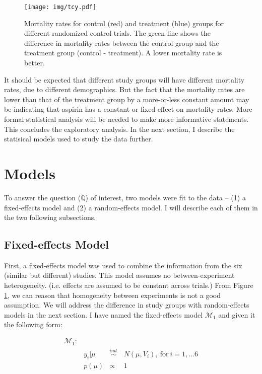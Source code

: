 \documentclass{../../tex_template/asaproc}
\newcommand{\M}{\mathcal{M}}
\newcommand{\Q}{\mathbb{Q}}
\newcommand{\simi}{\overset{ind.}{\sim}}
\begin{document}
\begin{figure}[H]
  \texttt{[image: img/tcy.pdf]}
  \caption{\small Mortality rates for control (red) and treatment (blue) groups
  for different randomized control trials. The green line shows the difference
  in mortality rates between the control group and the treatment group (control -
  treatment). A lower mortality rate is better.}
  \label{fig:tcy}
\end{figure}

It should be expected that different study groups will have different mortality
rates, due to different demographics. But the fact that the mortality rates are
lower than that of the treatment group by a more-or-less constant amount may be
indicating that aspirin has a constant or fixed effect on mortality rates.
More formal statistical analysis will be needed to make more informative
statements.\\

This concludes the exploratory analysis. In the next section, I describe the
statisical models used to study the data further.\\

\section{Models} 
To answer the question ($\Q$) of interest, two models were fit to the data --
(1) a fixed-effects model and (2) a random-effects model. I will describe each
of them in the two following subsections.\\

\subsection{Fixed-effects Model}
First, a fixed-effects model was used to combine the information from the six
(similar but different) studies. This model assumes no between-experiment
heterogeneity. (i.e. effects are assumed to be constant across trials.) From
Figure \ref{fig:tcy}, we can reason that homogeneity between experiments is not
a good assumption. We will address the difference in study groups with
random-effects models in the next section. I have named the fixed-effects
model $\M_1$ and given it the following form:

$$
\begin{array}{lrcl}
  \M_1: \\
  & y_i | \mu &\simi& N(\mu,V_i),~\text{for$~i = 1,...6$}\\
  & p(\mu) &\propto& 1\\
\end{array}
$$
\end{document}
